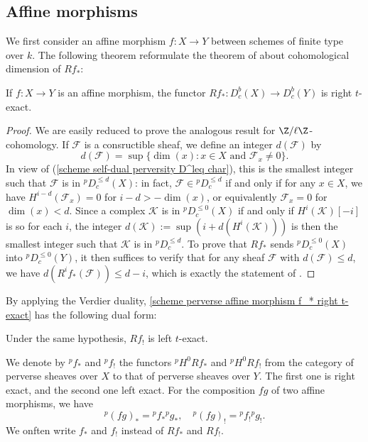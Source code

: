 \subsection{Affine morphisms}
We first consider an affine morphism $f:X\to Y$ between schemes of finite type over $k$. The following theorem reformulate the theorem of \cite[XIV 3.1]{SGA4-3} about cohomological dimension of $Rf_*$:

\begin{theorem}\label{scheme perverse affine morphism f_* right t-exact}
If $f:X\to Y$ is an affine morphism, the functor $Rf_*:D^b_c(X)\to D^b_c(Y)$ is right $t$-exact.
\end{theorem}
\begin{proof}
We are easily reduced to prove the analogous result for $\Z/\ell\Z$-cohomology. If $\mathscr{F}$ is a consructible sheaf, we define an integer $d(\mathscr{F})$ by
\[d(\mathscr{F})=\sup\{\dim(x):\text{$x\in X$ and $\mathscr{F}_x\neq 0$}\}.\]
In view of (\ref{scheme self-dual perversity D^leq char}), this is the smallest integer such that $\mathscr{F}$ is in ${^p\!D_c^{\leq d}}(X)$: in fact, $\mathscr{F}\in{^p\!D_c^{\leq d}}$ if and only if for any $x\in X$, we have $H^{i-d}(\mathscr{F}_x)=0$ for $i-d>-\dim(x)$, or equivalently $\mathscr{F}_x=0$ for $\dim(x)<d$. Since a complex $\mathscr{K}$ is in ${^p\!D_c^{\leq 0}}(X)$ if and only if $H^i(\mathscr{K})[-i]$ is so for each $i$, the integer $d(\mathscr{K}):=\sup(i+d(H^i(\mathscr{K})))$ is then the smallest integer such that $\mathscr{K}$ is in ${^p\!D_c^{\leq d}}$. To prove that $Rf_*$ sends ${^p\!D_c^{\leq 0}}(X)$ into ${^p\!D_c^{\leq 0}}(Y)$, it then suffices to verify that for any sheaf $\mathscr{F}$ with $d(\mathscr{F})\leq d$, we have $d(R^if_*(\mathscr{F}))\leq d-i$, which is exactly the statement of \cite[XIV 3.1]{SGA4-3}.
\end{proof}

By applying the Verdier duality, \cref{scheme perverse affine morphism f_* right t-exact} has the following dual form:

\begin{corollary}\label{scheme perverse affine morphism f_! right t-exact}
Under the same hypothesis, $Rf_!$ is left $t$-exact.
\end{corollary}

We denote by ${^p\!f_*}$ and ${^p\!f_!}$ the functors ${^p\!H^0Rf_*}$ and ${^p\!H^0Rf_!}$ from the category of perverse sheaves over $X$ to that of perverse sheaves over $Y$. The first one is right exact, and the second one left exact. For the composition $fg$ of two affine morphisms, we have
\[{^p\!(fg)_*}={^p\!f_*}{^p\!g_*},\quad {^p\!(fg)_!}={^p\!f_!}{^p\!g_!}.\]
We onften write $f_*$ and $f_!$ instead of $Rf_*$ and $Rf_!$.

